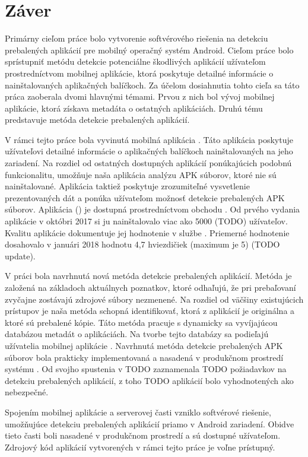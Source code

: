 \chapter{Záver}
Primárny cieľom práce bolo vytvorenie softvérového riešenia na detekciu prebalených aplikácií pre mobilný operačný systém Android. Cieľom práce bolo sprístupniť metódu detekcie potenciálne škodlivých aplikácií užívateľom prostredníctvom mobilnej aplikácie, ktorá poskytuje detailné informácie o nainštalovaných aplikačných balíčkoch.  
Za účelom dosiahnutia tohto cieľa sa táto práca zaoberala dvomi hlavnými témami. Prvou z nich bol vývoj mobilnej aplikácie, ktorá získava metadáta o ostatných aplikáciách. Druhú tému predstavuje metóda detekcie prebalených aplikácií. 

V rámci tejto práce bola vyvinutá mobilná aplikácia . Táto aplikácia poskytuje užívateľovi detailné informácie o aplikačných balíčkoch nainštalovaných na jeho zariadení. Na rozdiel od ostatných dostupných aplikácií ponúkajúcich podobnú funkcionalitu, umožňuje naša aplikácia analýzu APK súborov, ktoré nie sú nainštalované. Aplikácia taktiež poskytuje zrozumiteľné vysvetlenie prezentovaných dát a ponúka užívateľom možnosť detekcie prebalených APK súborov. Aplikácia  () je dostupná prostredníctvom obchodu . Od prvého vydania aplikácie v októbri 2017 si ju nainštalovalo viac ako 5000 (TODO) užívateľov. Kvalitu aplikácie dokumentuje jej hodnotenie v službe . Priemerné hodnotenie dosahovalo v januári 2018 hodnotu 4,7 hviezdičiek (maximum je 5) (TODO update).

V práci bola navrhnutá nová metóda detekcie prebalených aplikácií. Metóda je založená na základoch aktuálnych poznatkov, ktoré odhaľujú, že pri prebaľovaní zvyčajne zostávajú zdrojové súbory nezmenené. Na rozdiel od väčšiny existujúcich prístupov je naša metóda schopná identifikovať, ktorá z aplikácií je originálna a ktoré sú prebalené kópie. Táto metóda pracuje s dynamicky sa vyvíjajúcou databázou metadát o aplikáciách. Na tvorbe tejto databázy sa podieľajú užívatelia mobilnej aplikácie . Navrhnutá metóda detekcie prebalených APK súborov bola prakticky implementovaná a nasadená v produkčnom prostredí systému . Od svojho spustenia v TODO zaznamenala TODO požiadavkov na detekciu prebalených aplikácií, z toho TODO aplikácií bolo vyhodnotených ako nebezpečné.


Spojením mobilnej aplikácie a serverovej časti vzniklo softvérové riešenie, umožňujúce detekciu prebalených aplikácií priamo v Android zariadení. Obidve tieto časti boli nasadené v produkčnom prostredí a sú dostupné užívateľom. Zdrojový kód aplikácií vytvorených v rámci tejto práce je voľne prístupný.
